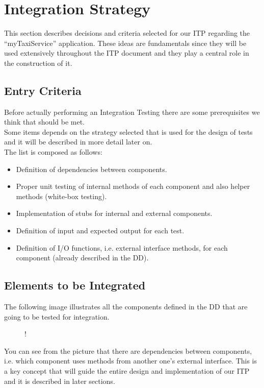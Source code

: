\break
\section{Integration Strategy}
This section describes decisions and criteria selected for our ITP regarding the ``myTaxiService'' application. These ideas are fundamentals since they will be used extensively throughout the ITP document and they play a central role in the construction of it.
\subsection{Entry Criteria}
Before actually performing an Integration Testing there are some prerequisites we think that should be met. \\ Some items depends on the strategy selected that is used for the design of tests and it will be described in more detail later on. \\
The list is composed as follows:
\begin{itemize}
	\item Definition of dependencies between components.
	\item Proper unit testing of internal methods of each component and also helper methods (white-box testing).
	\item Implementation of stubs for internal and external components.
	\item Definition of input and expected output for each test.
	\item Definition of I/O functions, i.e. external interface methods, for each component (already described in the DD).
\end{itemize} 
\subsection{Elements to be Integrated}
The following image illustrates all the components defined in the DD that are going to be tested for integration.
\begin{figure}[H]
	\centering
	\resizebox{6in}
	{!}{}
\end{figure}
You can see from the picture that there are dependencies between components, i.e. which component uses methods from another one's external interface. This is a key concept that will guide the entire design and implementation of our ITP and it is described in later sections.
